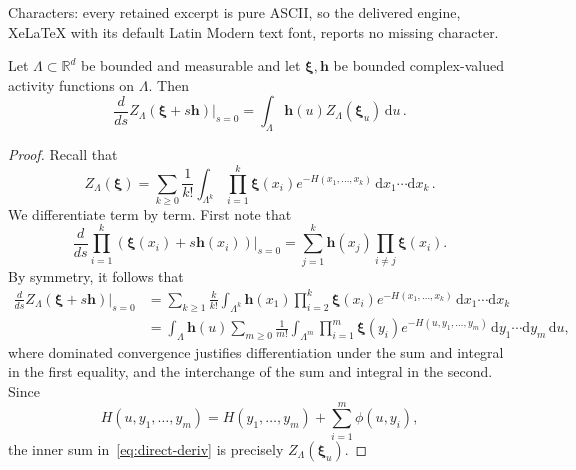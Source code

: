 \documentclass[10pt,a4paper]{amsart}
\newcommand{\R}{\mathbb{R}}
\newcommand{\diff}{\mathrm{d}}
\newcommand{\potential}{\phi}
\newcommand{\region}{\Lambda}
\begin{document}
Characters: every retained excerpt is pure ASCII, so the delivered engine, XeLaTeX with its default Latin Modern text font, reports no missing character.
	\begin{lemma}
		\label{lem:log-derivative-F}
		Let \(\region\subset\R^d\) be bounded and measurable and let $\pmb{\xi}, \pmb{h}$ be bounded complex-valued activity functions on $\Lambda$. Then
		\[
		\frac{d}{ds}Z_\region(\pmb{\xi}+s\pmb{h})\bigg|_{s=0}
		=
		\int_\region \pmb{h}(u)Z_\region(\pmb{\xi}_u)\,\diff u\, . 
		\]
	\end{lemma}

	\begin{proof}
		Recall that
		\[
		Z_\region(\pmb{\xi})
		=
		\sum_{k\ge0}\frac1{k!}
		\int_{\region^k}
		\prod_{i=1}^k \pmb{\xi}(x_i)
		e^{-H(x_1,\ldots,x_k)}
		\,\diff x_1\cdots \diff x_k\, .
		\]
		We differentiate term by term. First note that
		\[
		\frac{d}{ds}
		\prod_{i=1}^k(\pmb{\xi}(x_i)+s\pmb{h}(x_i))
		\bigg|_{s=0}
		=
		\sum_{j=1}^k
		\pmb{h}(x_j)\prod_{i\ne j}\pmb{\xi}(x_i).
		\]
		By symmetry, it follows that
		\begin{align}
			\frac{d}{ds}Z_\region(\pmb{\xi}+s\pmb{h})\bigg|_{s=0}
			&=
			\sum_{k\ge1}\frac{k}{k!}
			\int_{\region^k}
			\pmb{h}(x_1)
			\prod_{i=2}^k \pmb{\xi}(x_i)
			e^{-H(x_1,\ldots,x_k)}
			\,\diff x_1\cdots \diff x_k \nonumber \\
			&=
			\int_\region \pmb{h}(u)
			\sum_{m\ge0}\frac1{m!}
			\int_{\region^m}
			\prod_{i=1}^m \pmb{\xi}(y_i)
			e^{-H(u,y_1,\ldots,y_m)}
			\,\diff y_1\cdots \diff y_m
			\,\diff u , \label{eq:direct-deriv}
		\end{align}
		where dominated convergence justifies differentiation under the sum and integral in the first equality, and the interchange of the sum and integral in the second. 
		Since
		\[
		H(u,y_1,\ldots,y_m)
		=
		H(y_1,\ldots,y_m)
		+
		\sum_{i=1}^m \potential(u,y_i),
		\]
		the inner sum in~\eqref{eq:direct-deriv} is precisely $Z_\region(\pmb{\xi}_u)$.
	\end{proof}
\end{document}
